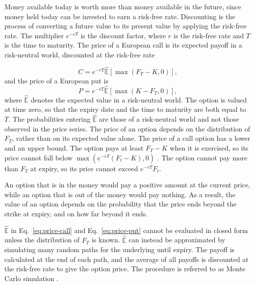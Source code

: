 Money available today is worth more than money available in the future, since money held today can be invested to earn a risk-free rate. Discounting is the process of converting a future value to its present value by applying the risk-free rate. The multiplier $e^{-r T}$ is the discount factor, where $r$ is the risk-free rate and $T$ is the time to maturity. The price of a European call is its expected payoff in a risk-neutral world, discounted at the risk-free rate

\begin{equation}
    C = e^{-r T} \hat{\mathbb{E}}[\max(F_T - K, 0)],
    \label{eq:price-call}
\end{equation}
and the price of a European put is 
\begin{equation}
    P = e^{-r T} \hat{\mathbb{E}}[\max(K - F_T, 0)],
    \label{eq:price-put}
\end{equation}
where $\hat{\mathbb{E}}$ denotes the expected value in a risk-neutral world. The option is valued at time zero, so that the expiry date and the time to maturity are both equal to $T$. The probabilities entering $\hat{\mathbb{E}}$ are those of a risk-neutral world and not those observed in the price series. The price of an option depends on the distribution of $F_T$, rather than on its expected value alone. The price of a call option has a lower and an upper bound. The option pays at least $F_T-K$ when it is exercised, so its price cannot fall below $\max{(e^{-r T} (F_t - K),0)}$ \parencite[406]{hullOptionsFuturesOther2022}. The option cannot pay more than $F_T$ at expiry, so its price cannot exceed $e^{-r T} F_t$.


An option that is in the money would pay a positive amount at the current price, while an option that is out of the money would pay nothing. As a result, the value of an option depends on the probability that the price ends beyond the strike at expiry, and on how far beyond it ends.

$\hat{\mathbb{E}}$ in Eq.~\eqref{eq:price-call} and Eq.~\eqref{eq:price-put} cannot be evaluated in closed form unless the distribution of $F_T$ is known. $\hat{\mathbb{E}}$ can instead be approximated by simulating many random paths for the underlying until expiry. The payoff is calculated at the end of each path, and the average of all payoffs is discounted at the risk-free rate to give the option price. The procedure is referred to as Monte Carlo simulation \parencite[490]{hullOptionsFuturesOther2022}.
